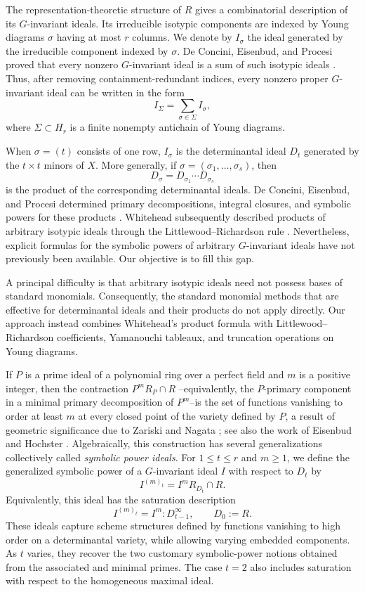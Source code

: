 \documentclass[11pt, reqno]{amsart}
\numberwithin{equation}{section}
\theoremstyle{definition}
\begin{document}
The representation-theoretic structure of $R$ gives a combinatorial
description of its $G$-invariant ideals.  Its irreducible isotypic components
are indexed by Young diagrams $\sigma$ having at most $r$ columns.  We denote
by $I_\sigma$ the ideal generated by the irreducible component indexed by $\sigma$.
De Concini, Eisenbud, and Procesi proved that every nonzero $G$-invariant ideal is a
sum of such isotypic ideals \cite{deconcini1980young}.  Thus, after removing
containment-redundant indices, every nonzero proper $G$-invariant ideal can be written
in the form
\[
I_\Sigma=\sum_{\sigma\in\Sigma}I_\sigma,
\]
where $\Sigma\subset H_r$ is a finite nonempty antichain of Young diagrams.

When $\sigma=(t)$ consists of one row, $I_\sigma$ is the determinantal ideal
$D_t$ generated by the $t\times t$ minors of $X$.  More generally, if
$\sigma=(\sigma_1,\ldots,\sigma_s)$, then
\[
D_\sigma=D_{\sigma_1}\cdots D_{\sigma_s}
\]
is the product of the corresponding determinantal ideals.  De Concini,
Eisenbud, and Procesi determined primary decompositions, integral closures,
and symbolic powers for these products \cite{deconcini1980young}.  Whitehead
subsequently described products of arbitrary isotypic ideals through the
Littlewood--Richardson rule \cite{WhiteheadThesis}.  Nevertheless, explicit
formulas for the symbolic powers of arbitrary $G$-invariant ideals have not
previously been available. Our objective is to fill this gap.

A principal difficulty is that arbitrary isotypic ideals need not possess
bases of standard monomials.  Consequently, the standard monomial methods
that are effective for determinantal ideals and their products do not apply
directly.  Our approach instead combines Whitehead's product formula with
Littlewood--Richardson coefficients, Yamanouchi tableaux, and truncation
operations on Young diagrams.

If $P$ is a prime ideal of a polynomial ring over a perfect field and $m$ is a positive integer, then the contraction $P^mR_P\cap R$ --equivalently, the $P$-primary component in a minimal primary decomposition of $P^m$--is the set of functions vanishing to order at least $m$ at every closed point of the variety defined by $P$, a result of geometric significance due to Zariski and Nagata \cite{Zariski54}; see also the work of Eisenbud and Hochster \cite{EisenbudHochster}. Algebraically, this construction has several generalizations collectively called {\em symbolic power ideals}.
For $1\leq t\leq r$ and $m\geq1$, we define the generalized symbolic power of a $G$-invariant ideal $I$ with respect to $D_t$ by
\[
I^{(m)_t}=I^mR_{D_t}\cap R.
\]
Equivalently, this ideal has the saturation description
\[
I^{(m)_t}=I^m:D_{t-1}^{\infty},
\qquad D_0:=R.
\]
These ideals capture scheme structures defined by functions vanishing to high order on a determinantal variety, while allowing varying embedded components. As $t$ varies, they recover the two customary symbolic-power notions obtained from the associated and minimal primes. The case $t=2$ also includes saturation with respect to the homogeneous maximal ideal.
\end{document}
